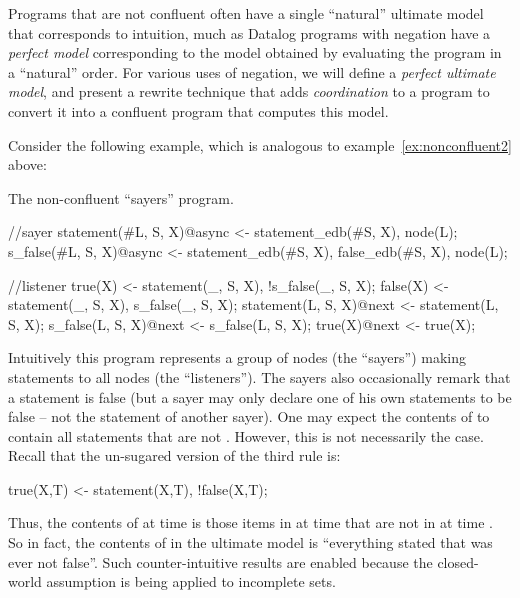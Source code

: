 Programs that are not confluent often have a single ``natural'' ultimate model that corresponds to intuition, much as Datalog programs with negation have a {\em perfect model} corresponding to the model obtained by evaluating the program in a ``natural'' order.  For various uses of negation, we will define a {\em perfect ultimate model}, and present a rewrite technique that adds {\em coordination} to a \lang program to convert it into a confluent \lang program that computes this model.

Consider the following example, which is analogous to example~\ref{ex:nonconfluent2} above:

\begin{example}
\label{ex:sayers}
The non-confluent ``sayers'' program.

\begin{Dedalus}
//sayer
statement(#L, S, X)@async <- statement_edb(#S, X),
                             node(L);
s_false(#L, S, X)@async <- statement_edb(#S, X),
                           false_edb(#S, X),
                           node(L);

//listener
true(X) <- statement(_, S, X), !s_false(_, S, X);
false(X) <- statement(_, S, X), s_false(_, S, X);
statement(L, S, X)@next <- statement(L, S, X);
s_false(L, S, X)@next <- s_false(L, S, X);
true(X)@next <- true(X);
\end{Dedalus}
\end{example}

Intuitively this program represents a group of nodes (the ``sayers'') making statements to all nodes (the ``listeners'').  The sayers also occasionally remark that a statement is false (but a sayer may only declare one of his own statements to be false -- not the statement of another sayer).  One may expect the contents of  to contain all statements that are not .  However, this is not necessarily the case.  Recall that the un-sugared version of the third rule is:

\begin{Dedalus}
true(X,T) <- statement(X,T), !false(X,T);
\end{Dedalus}

Thus, the contents of  at time  is those items in  at time  that are not in  at time .  So in fact, the contents of  in the ultimate model is ``everything stated that was ever not false''.  Such counter-intuitive results are enabled because the closed-world assumption is being applied to incomplete sets.

